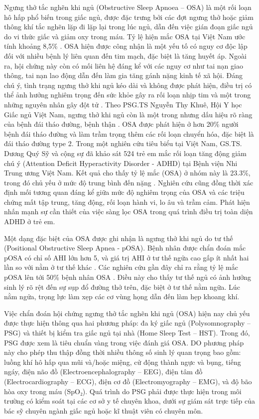 Ngưng thở tắc nghẽn khi ngủ (Obstructive Sleep Apnoea – OSA) là một rối loạn hô hấp phổ biến trong giấc ngủ, được đặc trưng bởi các đợt ngưng thở hoặc giảm thông khí tắc nghẽn lặp đi lặp lại trong lúc ngủ, dẫn đến việc gián đoạn giấc ngủ do vi thức giấc và giảm oxy trong máu.  Tỷ lệ hiện mắc OSA tại Việt Nam ước tính khoảng 8,5\% \cite{nguoimacOSA_VN}. OSA hiện được công nhận là một yếu tố có nguy cơ độc lập đối với nhiều bệnh lý liên quan đến tim mạch, đặc biệt là tăng huyết áp. Ngoài ra, hội chứng này còn có mối liên hệ đáng kể với các nguy cơ như tai nạn giao thông, tai nạn lao động dẫn đến làm gia tăng gánh nặng kinh tế xã hội\cite{osa_bike}\cite{Marin2005}\cite{drive_osa}. Đáng chú ý, tình trạng ngưng thở khi ngủ kéo dài và không được phát hiện, điều trị có thể ảnh hưởng nghiêm trọng đến sức khỏe gây ra rối loạn nhịp tim và một trong những nguyên nhân gây đột tử \cite{sumarry_osa}. Theo PSG.TS Nguyễn Thy Khuê, Hội Y học Giấc ngủ Việt Nam, ngưng thở khi ngủ còn là một trong nhưng dấu hiệu rõ ràng của bệnh đái tháo đường, bệnh thận \cite{bsThyKhue}. OSA được phát hiện ở hơn 20\% người bệnh đái tháo đường và làm trầm trọng thêm các rối loạn chuyển hóa, đặc biệt là đái tháo đường type 2. Trong một nghiên cứu tiêu biểu tại Việt Nam, GS.TS. Dương Quý Sỹ và cộng sự đã khảo sát 524 trẻ em mắc rối loạn tăng động giảm chú ý (Attention Deficit Hyperactivity Disorder - ADHD) tại Bệnh viện Nhi Trung ương Việt Nam. Kết quả cho thấy tỷ lệ mắc (OSA) ở nhóm này là 23.3\%, trong đó chủ yếu ở mức độ trung bình đến nặng \cite{ThaySUCHildren}. Nghiên cứu cũng đồng thời xác định mối tương quan đáng kể giữa mức độ nghiêm trọng của OSA và các triệu chứng mất tập trung, tăng động, rối loạn hành vi, lo âu và trầm cảm. Phát hiện nhấn mạnh sự cần thiết của việc sàng lọc OSA trong quá trình điều trị toàn diện ADHD ở trẻ em. 

Một dạng đặc biệt của OSA được ghi nhận là ngưng thở khi ngủ do tư thế (Positional Obstructive Sleep Apnea - pOSA). Bệnh nhân được chẩn đoán mắc pOSA có chỉ số AHI lớn hơn 5, và giá trị AHI ở tư thế ngửa cao gấp ít nhất hai lần so với nằm ở tư thế khác \cite{heinzer2018}. Các nghiên cứu gần đây chỉ ra rằng tỷ lệ mắc pOSA lên tới 50\% bệnh nhân OSA \cite{sabil2020}. Điều này cho thấy tư thế ngủ có ảnh hưởng sinh lý rõ rệt đến sự sụp đổ đường thở trên, đặc biệt ở tư thế nằm ngữa. Lúc nằm ngửa, trọng lực làm xẹp các cơ vùng họng dẫn đến làm hẹp khoang khí.

Việc chẩn đoán hội chứng ngưng thở tắc nghẽn khi ngủ (OSA) hiện nay chủ yếu được thực hiện thông qua hai phương pháp: đa ký giấc ngủ (Polysomnography – PSG) và thiết bị kiểm tra giấc ngủ tại nhà (Home Sleep Test – HST). Trong đó, PSG được xem là tiêu chuẩn vàng trong việc đánh giá OSA. DO phương pháp này cho phép thu thập đồng thời nhiều thông số sinh lý quan trọng bao gồm: luồng khí hô hấp qua mũi và/hoặc miệng, cử động thành ngực và bụng, tiếng ngáy, điện não đồ (Electroencephalography – EEG), điện tâm đồ (Electrocardiography – ECG), điện cơ đồ (Electromyography – EMG), và độ bão hòa oxy trong máu (SpO₂). Quá trình do PSG phải được thực hiện trong môi trường có kiểm soát tại các cơ sở y tế chuyên khoa, dưới sự giám sát trực tiếp của bác sỹ chuyên ngành giấc ngủ hoặc kĩ thuật viên có chuyên môn\cite{psg_paper}\cite{kushida2005psg}. 


